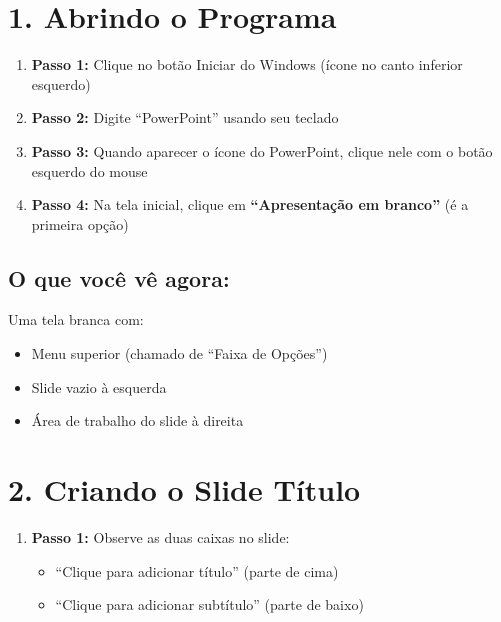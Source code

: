 \documentclass[11pt]{article}
\title{\color{blue}{Aula de PowerPoint -- Guia Passo a Passo}}
\author{Professor(a): \rule{4cm}{0.4pt} \\ \hspace{3.2cm} Estudante:\rule{4cm}{0.4pt}  \; Turma: \rule{2cm}{0.4pt} \\}
\date{}
\begin{document}
\maketitle

\begin{multicols}{2}

\section*{1. Abrindo o Programa}

\begin{enumerate}
\item \textbf{Passo 1:} Clique no botão Iniciar do Windows (ícone no canto inferior esquerdo)

\item \textbf{Passo 2:} Digite ``PowerPoint'' usando seu teclado

\item \textbf{Passo 3:} Quando aparecer o ícone do PowerPoint, clique nele com o botão esquerdo do mouse

\item \textbf{Passo 4:} Na tela inicial, clique em \textbf{``Apresentação em branco''} (é a primeira opção)
\end{enumerate}

\subsection*{O que você vê agora:}
Uma tela branca com:
\begin{itemize}
\item Menu superior (chamado de ``Faixa de Opções'')
\item Slide vazio à esquerda
\item Área de trabalho do slide à direita
\end{itemize}

\section*{2. Criando o Slide Título}

\begin{enumerate}
\item \textbf{Passo 1:} Observe as duas caixas no slide:
\begin{itemize}
\item ``Clique para adicionar título'' (parte de cima)
\item ``Clique para adicionar subtítulo'' (parte de baixo)
\end{itemize}


\end{enumerate}
\end{multicols}
\end{document}

